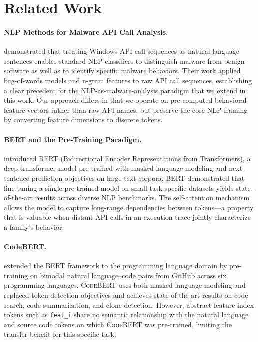 \documentclass[11pt]{article}
\begin{document}
\section{Related Work}
\label{sec:related}

\paragraph{NLP Methods for Malware API Call Analysis.}
\citet{tran2017nlp} demonstrated that treating Windows API call sequences
as natural language sentences enables standard NLP classifiers to
distinguish malware from benign software as well as to identify specific
malware behaviors. Their work applied bag-of-words models and
n-gram features to raw API call sequences, establishing a clear
precedent for the NLP-as-malware-analysis paradigm that we extend in this
work. Our approach differs in that we operate on pre-computed behavioral
feature vectors rather than raw API names, but preserve the core NLP
framing by converting feature dimensions to discrete tokens.

\paragraph{BERT and the Pre-Training Paradigm.}
\citet{devlin-etal-2019-bert} introduced \textsc{BERT} (Bidirectional
Encoder Representations from Transformers), a deep transformer model
pre-trained with masked language modeling and next-sentence prediction
objectives on large text corpora. \textsc{BERT} demonstrated that
fine-tuning a single pre-trained model on small task-specific datasets
yields state-of-the-art results across diverse NLP benchmarks. The
self-attention mechanism allows the model to capture long-range
dependencies between tokens—a property that is valuable when distant API
calls in an execution trace jointly characterize a family's behavior.

\paragraph{CodeBERT.}
\citet{feng-etal-2020-codebert} extended the BERT framework to the
programming language domain by pre-training on bimodal natural
language–code pairs from GitHub across six programming languages.
\textsc{CodeBERT} uses both masked language modeling and replaced token
detection objectives and achieves state-of-the-art results on code
search, code summarization, and clone detection. However, abstract
feature index tokens such as \texttt{feat\_i} share no semantic
relationship with the natural language and source code tokens on which
\textsc{CodeBERT} was pre-trained, limiting the transfer benefit for
this specific task.
\end{document}
